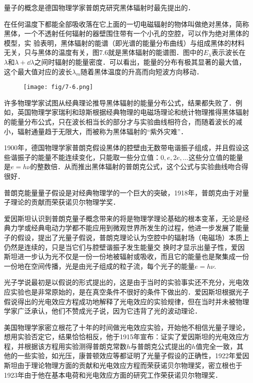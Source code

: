 量子的概念是德国物理学家普朗克研究黑体辐射时最先提出的．

在任何温度下都能全部吸收落在它上面的一切电磁辐射的物体叫做绝对黑体，简称黑体，一个不透射任何辐射的器壁围住带有一个小孔的空腔，可以作为绝对黑体的模型，实
验表明，黑体辐射的能谱（即光谱的能量分布曲线）与组成黑体的材料无关，只与黑体的温度有关，图7.6就是黑体辐射的能谱图．图中的$E_{\lambda}$表示波长在$\lambda$和$\lambda+\dd \lambda$之间时辐射的能量密度．可以看出，能量的分布有极其显著的最大值，这个最大值对应的波长$\lambda_m$随着黑体温度的升高而向短波方向移动．
\begin{figure}[htp]
    \centering
\texttt{[image: fig/7-6.png]}
    \caption{}
\end{figure}

许多物理学家试图从经典理论推导黑体辐射的能量分布公式，结果都失败了．例如，英国物理学家瑞利和琼斯根据经典物理的电磁场理论和统计物理推得黑体辐射的能量分布公式，只在波长相当长的部分才与实验曲线相符合，而随着波长的减小，辐射通量趋于无限大，而被称为黑体辐射的“紫外灾难”．

1900年，德国物理学家普朗克假设黑体的腔壁由无数带电谐振子组成，并且假设这些谐振子的能量不能连续变化，只能取一些分立值：$0,e,2e,\ldots$这些分立值的能量是$e=h\nu$的整数倍．从而推出黑体辐射的普朗克公式，这个公式与实验曲线吻合得很好．

普朗克能量量子假设是对经典物理学的一个巨大的突破，1918年，普朗克由于对量子理论的贡献而荣获诺贝尔物理学奖．

爱因斯坦认识到普朗克量子概念带来的将是物理学理论基础的根本变革，无论是经典力学或经典电动力学都不能应用到微观世界所发生的过程，他进一步发展了能量子的假设，提出了光量子假说，普朗克理论认为空腔中的辐射场（电磁场）本质上仍然是连续的，只是当它们与腔壁谐振子发生能量交
换时才显示出量子性，爱因斯坦进一步认为光不仅是一份一份地被辐射或吸收，而且它的能量也是聚集成一份一份地在空间传播，光是由光子组成的粒子流，每个光子的能量$e=h\nu$.

光子学说最初是以假说的形式提出的，这是由于当时的实验事实还不充分，光电效应实验也是非常原始的，是在真空条件不很好的条件下做出的．爱因斯坦根据光子假说得出的光电效应方程成功地解释了光电效应的实验规律，但在当时并未被物理学家广泛承认，他们不赞成光子说，因为它违背了光的波动理论．

美国物理学家密立根花了十年的时间做光电效应实验，开始他不相信光量子理论，想用实验否定它，结果恰恰相反，他于1915年宣布：证实了爱因斯坦的光电效应方程，并根据该方程用实验测得普朗克常数$h$与普朗克公式提出的$h$值完全一致，其他的一些实验，如光压，康普顿效应等都证明了光量子假设的正确性，1922年爱因斯坦由于理论物理方面的贡献和光电效应方程而荣获诺贝尔物理奖，密立根也于1923年由于他在基本电荷和光电效应方面的研究工作荣获诺贝尔物理奖．


